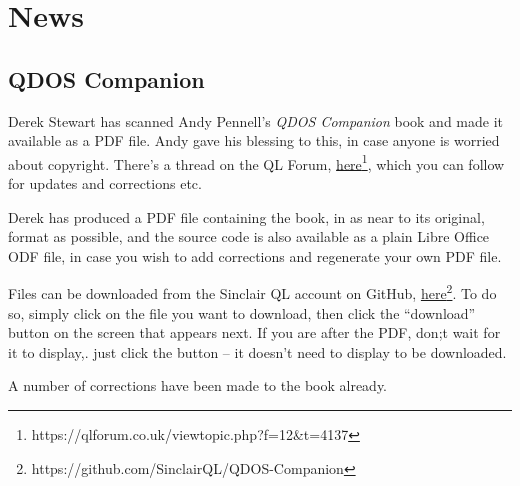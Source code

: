 
\chapter{News}

\section{QDOS Companion}

Derek Stewart has scanned Andy Pennell's \emph{QDOS Companion} book
and made it available as a PDF file. Andy gave his blessing to this,
in case anyone is worried about copyright. There's a thread on the
QL Forum, \href{https://qlforum.co.uk/viewtopic.php?f=12&t=4137}{here}\footnote{https://qlforum.co.uk/viewtopic.php?f=12\&t=4137},
which you can follow for updates and corrections etc.

Derek has produced a PDF file containing the book, in as near to its
original, format as possible, and the source code is also available
as a plain Libre Office ODF file, in case you wish to add corrections
and regenerate your own PDF file.

Files can be downloaded from the Sinclair QL account on GitHub, \href{https://github.com/SinclairQL/QDOS-Companion}{here}\footnote{https://github.com/SinclairQL/QDOS-Companion}.
To do so, simply click on the file you want to download, then click
the ``download'' button on the screen that appears next. If you
are after the PDF, don;t wait for it to display,. just click the button
-- it doesn't need to display to be downloaded.

A number of corrections have been made to the book already.
